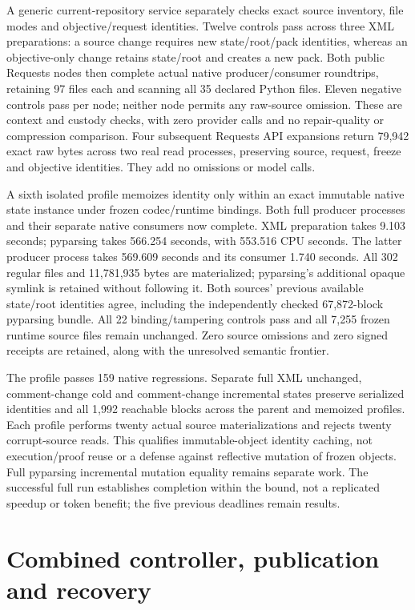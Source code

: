 A generic current-repository service separately checks exact source inventory,
file modes and objective/request identities. Twelve controls pass across three
XML preparations: a source change requires new state/root/pack identities,
whereas an objective-only change retains state/root and creates a new pack.
Both public Requests nodes then complete actual native producer/consumer
roundtrips, retaining 97 files each and scanning all 35 declared Python files.
Eleven negative controls pass per node; neither node permits any raw-source
omission. These are context and custody checks, with zero provider calls and
no repair-quality or compression comparison.
Four subsequent Requests API expansions return 79,942 exact raw bytes across
two real read processes, preserving source, request, freeze and objective
identities. They add no omissions or model calls.

A sixth isolated profile memoizes identity only within an exact immutable
native state instance under frozen codec/runtime bindings. Both full producer
processes and their separate native consumers now complete. XML preparation
takes 9.103 seconds; pyparsing takes 566.254 seconds, with
553.516 CPU seconds. The latter producer process takes 569.609
seconds and its consumer 1.740 seconds. All 302 regular files and
11,781,935 bytes are materialized; pyparsing's additional opaque symlink is
retained without following it. Both sources' previous available state/root
identities agree, including the independently checked 67,872-block pyparsing
bundle. All 22 binding/tampering controls pass and all 7,255 frozen runtime
source files remain unchanged. Zero source omissions and zero signed receipts
are retained, along with the unresolved semantic frontier.

The profile passes 159 native regressions. Separate full XML unchanged,
comment-change cold and comment-change incremental states preserve serialized
identities and all 1,992 reachable blocks across the parent and memoized
profiles. Each profile performs twenty actual source materializations and
rejects twenty corrupt-source reads. This qualifies immutable-object identity
caching, not execution/proof reuse or a defense against reflective mutation of
frozen objects. Full pyparsing incremental mutation equality remains separate
work. The successful full run establishes completion within the bound, not a
replicated speedup or token benefit; the five previous deadlines remain results.


\section{Combined controller, publication and recovery}
\label{sec:incremental-controller-publication}

